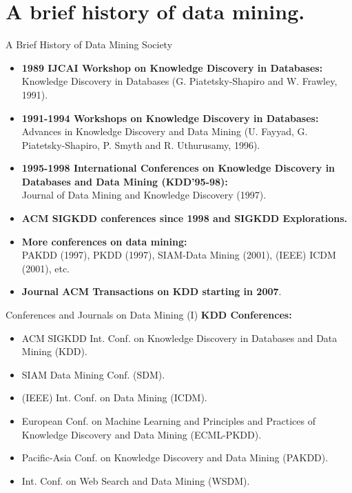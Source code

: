 \section{A brief history of data mining.}

\begin{frame}{A Brief History of Data Mining Society}
	\begin{itemize}
		\item \textbf{1989 IJCAI Workshop on Knowledge Discovery in 
		Databases:}\\
		Knowledge Discovery in Databases (G. Piatetsky-Shapiro and W. Frawley, 
		1991).
		\item \textbf{1991-1994 Workshops on Knowledge Discovery in 
		Databases:}\\
		Advances in Knowledge Discovery and Data Mining (U. Fayyad, G. 
		Piatetsky-Shapiro, P. Smyth and R. Uthurusamy, 1996).
		\item \textbf{1995-1998 International Conferences on Knowledge 
		Discovery in Databases and Data Mining (KDD’95-98):}\\
		Journal of Data Mining and Knowledge Discovery (1997).
		\item \textbf{ACM SIGKDD conferences since 1998 and SIGKDD 
		Explorations.}\\
		\item \textbf{More conferences on data mining:}\\
		PAKDD (1997), PKDD (1997), SIAM-Data Mining (2001), (IEEE) ICDM (2001), 
		etc.
		\item \textbf{Journal ACM Transactions on KDD starting in 2007}.
	\end{itemize}
\end{frame}

\begin{frame}{Conferences and Journals on Data Mining (I)}
	\textbf{KDD Conferences:}
	\begin{itemize}
		\item ACM SIGKDD Int. Conf. on Knowledge Discovery in Databases and 
		Data Mining (KDD).
		\item SIAM Data Mining Conf. (SDM).
		\item (IEEE) Int. Conf. on Data Mining (ICDM).
		\item European Conf. on Machine Learning and Principles and Practices 
		of Knowledge Discovery and Data Mining (ECML-PKDD).
		\item Pacific-Asia Conf. on Knowledge Discovery and Data Mining (PAKDD).
		\item Int. Conf. on Web Search and Data Mining (WSDM).
	\end{itemize}
\end{frame}

